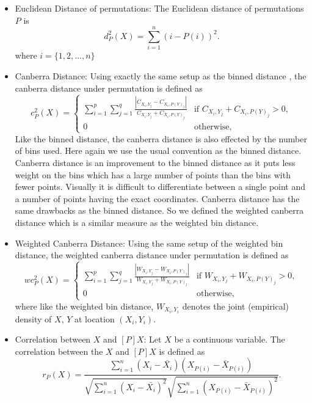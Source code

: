 \documentclass[12]{report}
\begin{document}
\begin{itemize}


\item Euclidean Distance of permutations: The Euclidean distance of permutations $P$ is 
\[
d^2_P(X) = \sum_{i=1}^n ( i - P(i))^2.
\]
where $i = \{1, 2, ..., n\}$


\item Canberra Distance: Using exactly the same setup as the binned distance , the canberra distance under permutation is defined as
\[
c^2_P(X)  = \left \{ 
\begin{array}{ll}
\sum_{i=1}^p \sum_{j=1}^q \frac{ |C_{X_i,Y_j} - C_{X_i,P(Y)_j}|}{ C_{X_i,Y_j} + C_{X_i,P(Y)_j}} & \text{if } C_{X_i,Y_j} + C_{X_i,P(Y)_j} > 0,\\
0 & \text{otherwise},
\end{array} \right.
\]
Like the binned distance, the canberra distance is also effected by the number of bins used. Here again we use the usual convention as the binned distance. Canberra distance is an improvement to the binned distance as it puts less weight on the bins which has a large number of points than the bins with fewer points. Visually it is difficult to differentiate between a single point and a number of points having the exact coordinates. Canberra distance has the same drawbacks as the binned distance. So we defined the weighted canberra distance which is a similar measure as the weighted bin distance.

\item Weighted Canberra Distance:  Using the same setup of the weighted bin distance, the weighted canberra distance under permutation is defined as 
\[
wc_P^2(X) = \left \{ 
\begin{array}{ll}
\sum_{i=1}^p \sum_{j=1}^q \frac{ |W_{X_i,Y_j} - W_{X_i,P(Y)_j}|}{ W_{X_i,Y_j} + W_{X_i,P(Y)_j}} & \text{if } W_{X_i,Y_j} + W_{X_i,P(Y)_j} > 0,\\
0 & \text{otherwise},
\end{array} \right.
\] 
where like the weighted bin distance, $W_{X_i,Y_i}$ denotes the joint (empirical) density of $X$, $Y$ at location $(X_i, Y_i)$. 

\item Correlation between $X$ and $[P]X$: Let $X$ be a continuous variable. The correlation between the $X$ and $[P]X$ is defined as
\[
r_P(X) = \frac{ \sum_{i=1}^n (X_i - \bar{X_i})(X_{P(i)} - \bar{X}_{P(i)})}{\sqrt{\sum_{i=1}^n (X_i - \bar{X_i})^2}\sqrt{\sum_{i=1}^n (X_{P(i)}- \bar{X}_{P(i)})^2}}.
\]


\end{itemize}
\end{document}
